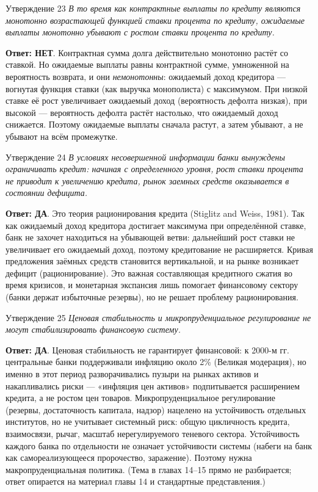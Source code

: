 \documentclass[10pt,a4paper]{article}
\newcommand{\qda}{\textbf{\color{yesgreen}Ответ: ДА}}
\newcommand{\qnet}{\textbf{\color{nored}Ответ: НЕТ}}
\newenvironment{answer}[2]{%
  \begin{qbox}{Утверждение #1}
  \textit{#2}\par\smallskip
}{%
  \end{qbox}\vspace{2pt}
}
\begin{document}
\begin{answer}{23}{В то время как контрактные выплаты по кредиту являются монотонно возрастающей функцией ставки процента по кредиту, ожидаемые выплаты монотонно убывают с ростом ставки процента по кредиту.}
\qnet. Контрактная сумма долга действительно монотонно растёт со ставкой. Но ожидаемые выплаты равны контрактной сумме, умноженной на вероятность возврата, и они \emph{немонотонны}: ожидаемый доход кредитора --- вогнутая функция ставки (как выручка монополиста) с максимумом. При низкой ставке её рост увеличивает ожидаемый доход (вероятность дефолта низкая), при высокой --- вероятность дефолта растёт настолько, что ожидаемый доход снижается. Поэтому ожидаемые выплаты сначала растут, а затем убывают, а не убывают на всём промежутке.
\end{answer}

\begin{answer}{24}{В условиях несовершенной информации банки вынуждены ограничивать кредит: начиная с определенного уровня, рост ставки процента не приводит к увеличению кредита, рынок заемных средств оказывается в состоянии дефицита.}
\qda. Это теория рационирования кредита (Stiglitz and Weiss, 1981). Так как ожидаемый доход кредитора достигает максимума при определённой ставке, банк не захочет находиться на убывающей ветви: дальнейший рост ставки не увеличивает его ожидаемый доход, поэтому кредитование не расширяется. Кривая предложения заёмных средств становится вертикальной, и на рынке возникает дефицит (рационирование). Это важная составляющая кредитного сжатия во время кризисов, и монетарная экспансия лишь помогает финансовому сектору (банки держат избыточные резервы), но не решает проблему рационирования.
\end{answer}

\begin{answer}{25}{Ценовая стабильность и микропруденциальное регулирование не могут стабилизировать финансовую систему.}
\qda. Ценовая стабильность не гарантирует финансовой: к 2000-м гг. центральные банки поддерживали инфляцию около 2\% (Великая модерация), но именно в этот период разворачивались пузыри на рынках активов и накапливались риски --- «инфляция цен активов» подпитывается расширением кредита, а не ростом цен товаров. Микропруденциальное регулирование (резервы, достаточность капитала, надзор) нацелено на устойчивость отдельных институтов, но не учитывает системный риск: общую цикличность кредита, взаимосвязи, рычаг, масштаб нерегулируемого теневого сектора. Устойчивость каждого банка по отдельности не означает устойчивости системы (набеги на банк как самореализующееся пророчество, заражение). Поэтому нужна макропруденциальная политика. (Тема в главах 14--15 прямо не разбирается; ответ опирается на материал главы 14 и стандартные представления.)
\end{answer}
\end{document}
